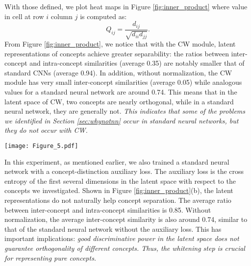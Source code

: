 \documentclass{article}
\begin{document}
With those defined, we plot heat maps in Figure \ref{fig:inner_product} where value in cell at row $i$ column $j$ is computed as:
\begin{equation}
    Q_{ij} = \frac{d_{ij}}{\sqrt{d_{ii}d_{jj}}}.
\end{equation}
From Figure \ref{fig:inner_product}, we notice that with the CW module, latent representations of concepts achieve greater separability: the ratios between inter-concept and intra-concept similarities (average 0.35) are notably smaller that of standard CNNs (average 0.94). In addition, without normalization, the CW module has very small inter-concept similarities (average 0.05) while analogous values for a standard neural network are around 0.74. This means that in the latent space of CW, two concepts are nearly orthogonal, while in a standard neural network, they are generally not. \textit{This indicates that some of the problems we identified in Section \ref{sec:whynotnn} occur in standard neural networks, but they do not occur with CW.}

\begin{figure*}[ht]
\centering
\texttt{[image: Figure\_5.pdf]}
\caption{Normalized intra-concept and inter-concept similarities. The diagonal values are normalized average similarities (see definition in Section \ref{sec:inter_inner}) between latent representations of images of the same concept; off-diagonal values are normalized average similarities between latent representations of images of different concepts. \textbf{a}, The $16^{th}$ layer is a BN module; \textbf{b}, The $16^{th}$ layer is a BN module with auxiliary loss to classify these concepts; \textbf{c}, The $16^{th}$ layer is a CW module. \label{fig:inner_product}}
\end{figure*}

In this experiment, as mentioned earlier, we also trained a standard neural network with a concept-distinction auxiliary loss. The auxiliary loss is the cross entropy of the first several dimensions in the latent space with respect to the concepts we investigated. Shown in Figure \ref{fig:inner_product}(b), the latent representations do not naturally help concept separation. The average ratio between inter-concept and intra-concept similarities is 0.85. Without normalization, the average inter-concept similarity is also around 0.74, similar to that of the standard neural network without the auxiliary loss. This has important implications: \textit{good discriminative power in the latent space does not guarantee orthogonality of different concepts. Thus, the whitening step is crucial for representing pure concepts.}
\end{document}
